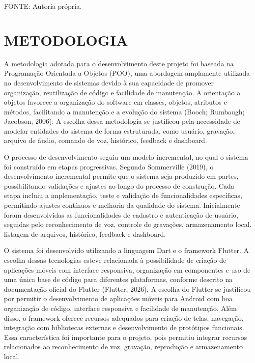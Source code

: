 \documentclass[12pt,oneside,a4paper,brazil,final]{abntex2}
\newcommand{\fontetabela}[1]{%
    \begin{center}
    {\fontsize{10}{12}\selectfont FONTE: #1}
    \end{center}
}
\begin{document}
\fontetabela{Autoria própria.}






\chapter{METODOLOGIA}

A metodologia adotada para o desenvolvimento deste projeto foi baseada na Programação Orientada a Objetos (POO), uma abordagem amplamente utilizada no desenvolvimento de sistemas devido à sua capacidade de promover organização, reutilização de código e facilidade de manutenção. A orientação a objetos favorece a organização do software em classes, objetos, atributos e métodos, facilitando a manutenção e a evolução do sistema (Booch; Rumbaugh; Jacobson, 2006). A escolha dessa metodologia se justificou pela necessidade de modelar entidades do sistema de forma estruturada, como usuário, gravação, arquivo de áudio, comando de voz, histórico, feedback e dashboard.

O processo de desenvolvimento seguiu um modelo incremental, no qual o sistema foi construído em etapas progressivas. Segundo Sommerville (2019), o desenvolvimento incremental permite que o sistema seja produzido em partes, possibilitando validações e ajustes ao longo do processo de construção. Cada etapa incluiu a implementação, teste e validação de funcionalidades específicas, permitindo ajustes contínuos e melhoria da qualidade do sistema. Inicialmente foram desenvolvidas as funcionalidades de cadastro e autenticação de usuário, seguidas pelo reconhecimento de voz, controle de gravações, armazenamento local, listagem de arquivos, histórico, feedback e dashboard.

O sistema foi desenvolvido utilizando a linguagem Dart e o framework Flutter. A escolha dessas tecnologias esteve relacionada à possibilidade de criação de aplicações móveis com interface responsiva, organização em componentes e uso de uma única base de código para diferentes plataformas, conforme descrito na documentação oficial do Flutter (Flutter, 2026). A escolha do Flutter se justificou por permitir o desenvolvimento de aplicações móveis para Android com boa organização de código, interface responsiva e facilidade de manutenção. Além disso, o framework oferece recursos adequados para criação de telas, navegação, integração com bibliotecas externas e desenvolvimento de protótipos funcionais. Essa característica foi importante para o projeto, pois permitiu integrar recursos relacionados ao reconhecimento de voz, gravação, reprodução e armazenamento local.
\end{document}

